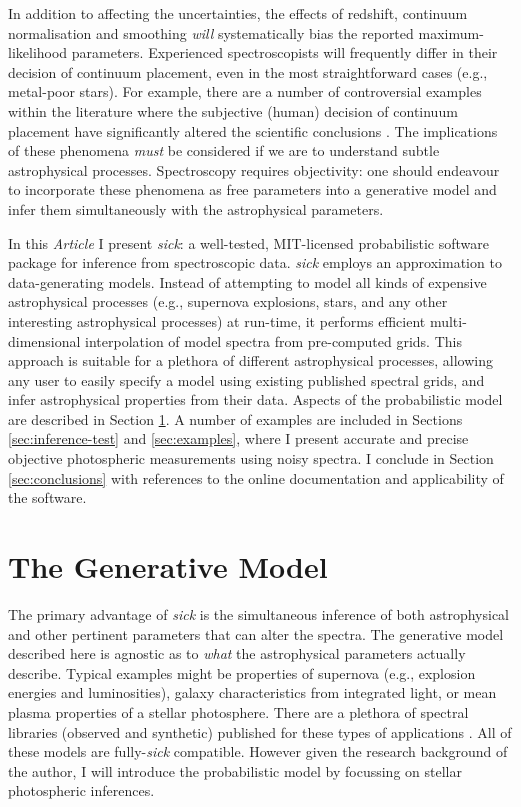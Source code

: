 \documentclass{aastex}
\newcommand{\sick}{\textit{sick}}
\newcommand{\article}{\textit{Article}}
\begin{document}
In addition to affecting the uncertainties, the effects of redshift, continuum 
normalisation and smoothing \textit{will} systematically bias the reported 
maximum-likelihood parameters. Experienced spectroscopists will frequently 
differ in their decision of continuum placement, even in the most 
straightforward cases (e.g., metal-poor stars). For example, there are a number 
of controversial examples within the literature where the subjective (human) 
decision of continuum placement have significantly altered the scientific 
conclusions \citep[e.g., see][where this issue is discussed in great 
detail]{kerzendorf}. The implications of these phenomena \textit{must} be 
considered if we are to understand subtle astrophysical processes. Spectroscopy 
requires objectivity: one should endeavour to incorporate these phenomena as 
free parameters into a generative model and infer them simultaneously with the 
astrophysical parameters.

In this \article{} I present \sick{}: a well-tested, MIT-licensed probabilistic 
software package for inference from spectroscopic data. \sick{} employs an 
approximation to data-generating models. Instead of attempting to model all 
kinds of expensive astrophysical processes (e.g., supernova explosions, stars, 
and any other interesting astrophysical processes) at run-time, it performs 
efficient multi-dimensional interpolation of model spectra from pre-computed 
grids. This approach is suitable for a plethora of different astrophysical 
processes, allowing any user to easily specify a model using existing published 
spectral grids, and infer astrophysical properties from their data. Aspects of 
the probabilistic model are described in Section \ref{sec:model}. A number of 
examples are included in Sections \ref{sec:inference-test} and \ref{sec:examples}, 
where I present accurate and precise objective photospheric measurements using 
noisy spectra. I conclude in Section \ref{sec:conclusions} with references to 
the online documentation and applicability of the software.

\section{The Generative Model}
\label{sec:model}

The primary advantage of \sick{} is the simultaneous inference of both 
astrophysical and other pertinent parameters that can alter the spectra. The 
generative model described here is agnostic as to \textit{what} the 
astrophysical parameters actually describe. Typical examples might be properties 
of supernova (e.g., explosion energies and luminosities), galaxy characteristics 
from integrated light, or mean plasma properties of a stellar photosphere. There 
are a plethora of spectral libraries (observed and synthetic) published for these 
types of applications \citep[e.g.,][]{snid,pegase,phoenix,pollux}. All of these 
models are fully-\sick{} compatible. However given the research background of 
the author, I will introduce the probabilistic model by focussing on stellar 
photospheric inferences.
\end{document}
